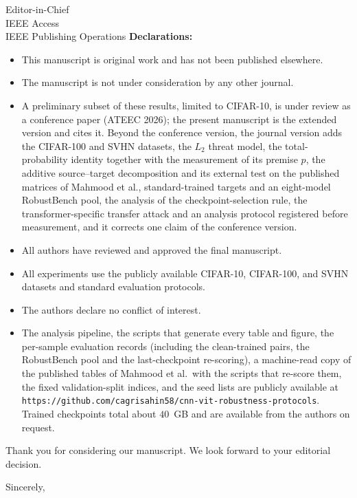\documentclass[11pt]{letter}
\begin{document}
\begin{letter}{
Editor-in-Chief\\
IEEE Access\\
IEEE Publishing Operations
}
\textbf{Declarations:}
\begin{itemize}
    \item This manuscript is original work and has not been published elsewhere.
    \item The manuscript is not under consideration by any other journal.
    \item A preliminary subset of these results, limited to CIFAR-10, is under review as a conference paper (ATEEC 2026); the present manuscript is the extended version and cites it. Beyond the conference version, the journal version adds the CIFAR-100 and SVHN datasets, the $L_2$ threat model, the total-probability identity together with the measurement of its premise $p$, the additive source--target decomposition and its external test on the published matrices of Mahmood et al., standard-trained targets and an eight-model RobustBench pool, the analysis of the checkpoint-selection rule, the transformer-specific transfer attack and an analysis protocol registered before measurement, and it corrects one claim of the conference version.
    \item All authors have reviewed and approved the final manuscript.
    \item All experiments use the publicly available CIFAR-10, CIFAR-100, and SVHN datasets and standard evaluation protocols.
    \item The authors declare no conflict of interest.
    \item The analysis pipeline, the scripts that generate every table and figure, the per-sample evaluation records (including the clean-trained pairs, the RobustBench pool and the last-checkpoint re-scoring), a machine-read copy of the published tables of Mahmood et al.\ with the scripts that re-score them, the fixed validation-split indices, and the seed lists are publicly available at \texttt{https://github.com/cagrisahin58/cnn-vit-robustness-protocols}. Trained checkpoints total about $40$~GB and are available from the authors on request.
\end{itemize}

Thank you for considering our manuscript. We look forward to your editorial decision.

\closing{Sincerely,}

\end{letter}
\end{document}
